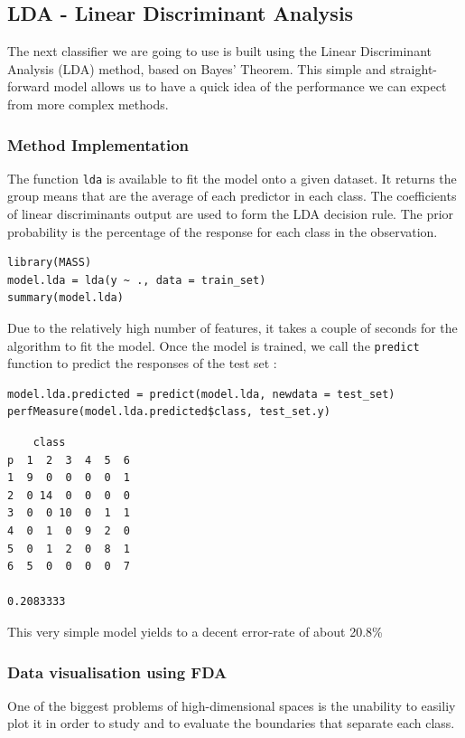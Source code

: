 \documentclass[]{report}
\begin{document}
\pagebreak

\subsection{LDA - Linear Discriminant Analysis}
The next classifier we are going to use is built using the Linear Discriminant Analysis (LDA) method, based on Bayes' Theorem. This simple and straight-forward model allows us to have a quick idea of the performance we can expect from more complex methods.  

\subsubsection{Method Implementation}
The function \texttt{lda} is available to fit the model onto a given dataset. It returns the group means that are the average of each predictor in each class. The coefficients of linear discriminants output are used to form the LDA decision rule. The prior probability is the percentage of the response for each class in the observation.

\begin{lstlisting}
library(MASS)
model.lda = lda(y ~ ., data = train_set)
summary(model.lda)
\end{lstlisting}

Due to the relatively high number of features, it takes a couple of seconds for the algorithm to fit the model.  Once the model is trained, we call the \texttt{predict} function to predict the responses of the test set : 

\begin{lstlisting}
model.lda.predicted = predict(model.lda, newdata = test_set)
perfMeasure(model.lda.predicted$class, test_set.y)
\end{lstlisting}

\begin{verbatim}
    class
p  1  2  3  4  5  6
1  9  0  0  0  0  1
2  0 14  0  0  0  0
3  0  0 10  0  1  1
4  0  1  0  9  2  0
5  0  1  2  0  8  1
6  5  0  0  0  0  7

0.2083333
\end{verbatim}

This very simple model yields to a decent error-rate of about 20.8\%

\subsubsection{Data visualisation using FDA}
One of the biggest problems of high-dimensional spaces is the unability to easiliy plot it in order to study and to evaluate the boundaries that separate each class.
\end{document}
